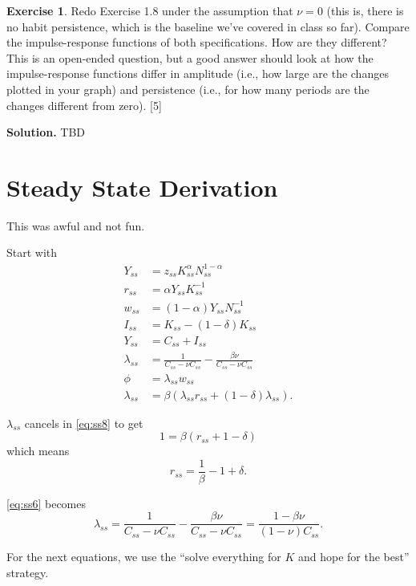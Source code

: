 \documentclass[11pt]{article}
\numberwithin{equation}{section} %
\numberwithin{figure}{section} %
\numberwithin{table}{section} %
\theoremstyle{definition}
\newtheorem{exercise}[theorem]{Exercise}
\newenvironment{solution}{\begin{addmargin}[2em]{0em} {\bf Solution. }}{\end{addmargin}}
\begin{document}
\begin{exercise}
    Redo Exercise 1.8 under the assumption that $\nu = 0$ (this is, there is no habit persistence, which is the baseline we've covered in class so far). Compare the impulse-response functions of both specifications. How are they different? This is an open-ended question, but a good answer should look at how the impulse-response functions differ in amplitude (i.e., how large are the changes plotted in your graph) and persistence (i.e., for how many periods are the changes different from zero). [5]
\end{exercise}

\begin{solution}
    TBD
\end{solution}


\clearpage
\appendix
\appendixpage

\section{Steady State Derivation}\label{sec:ss}

This was awful and not fun.

Start with 
\begin{align}
    Y_{ss} &= z_{ss} K_{ss}^\alpha N_{ss}^{1-\alpha} \label{eq:ss1} \\
    r_{ss} &= \alpha Y_{ss} K_{ss}^{-1} \label{eq:ss2} \\
    w_{ss} &= (1 - \alpha) Y_{ss} N_{ss}^{-1} \label{eq:ss3} \\
    I_{ss} &= K_{ss} - (1 - \delta) K_{ss} \label{eq:ss4} \\
    Y_{ss} &= C_{ss} + I_{ss} \label{eq:ss5} \\
    \lambda_{ss} &= \frac{1}{C_{ss} - \nu C_{ss}} - \frac{\beta \nu}{C_{ss} - \nu C_{ss}} \label{eq:ss6} \\
    \phi &= \lambda_{ss} w_{ss} \label{eq:ss7} \\
    \lambda_{ss} &= \beta(\lambda_{ss} r_{ss} + (1-\delta) \lambda_{ss}). \label{eq:ss8}
\end{align}

$\lambda_{ss}$ cancels in \ref{eq:ss8} to get
\[
    1 = \beta (r_{ss} + 1 - \delta)
\]
which means
\[
    r_{ss} = \frac{1}{\beta} - 1 + \delta.
\]

\ref{eq:ss6} becomes
\[
    \lambda_{ss} = \frac{1}{C_{ss} - \nu C_{ss}} - \frac{\beta \nu}{C_{ss} - \nu C_{ss}} = \frac{1 - \beta \nu}{(1-\nu) C_{ss}}.
\]

For the next equations, we use the ``solve everything for $K$ and hope for the best'' strategy.
\end{document}
